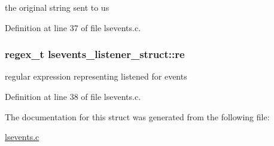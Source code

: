 the original string sent to us 



Definition at line 37 of file lsevents.\-c.

\hypertarget{structlsevents__listener__struct_a60b0f9e188a08e6101c494af89052d3f}{
\subsubsection[{re}]{\setlength{\rightskip}{0pt plus 5cm}regex\-\_\-t lsevents\-\_\-listener\-\_\-struct\-::re}}\label{structlsevents__listener__struct_a60b0f9e188a08e6101c494af89052d3f}


regular expression representing listened for events 



Definition at line 38 of file lsevents.\-c.



The documentation for this struct was generated from the following file\-:\begin{DoxyCompactItemize}
\item 
\hyperlink{lsevents_8c}{lsevents.\-c}\end{DoxyCompactItemize}

